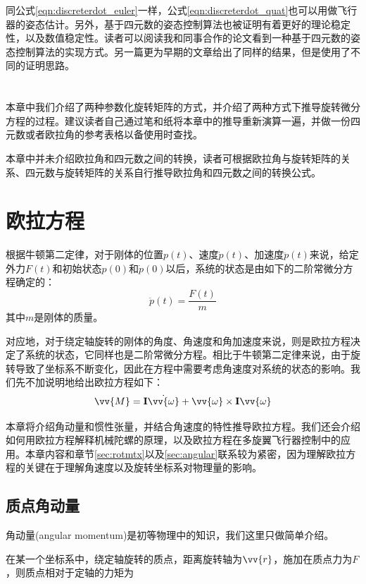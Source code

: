 \documentclass[11pt]{article}
\begin{document}
同公式\ref{eqn:discreterdot_euler}一样，公式\ref{eqn:discreterdot_quat}也可以用做飞行器的姿态估计。另外，基于四元数的姿态控制算法也被证明有着更好的理论稳定性，以及数值稳定性。读者可以阅读我和同事合作的论文\cite{7139416}看到一种基于四元数的姿态控制算法的实现方式。另一篇更为早期的文章\cite{5717652}给出了同样的结果，但是使用了不同的证明思路。
\ \\
\ \\
\ \\
本章中我们介绍了两种参数化旋转矩阵的方式，并介绍了两种方式下推导旋转微分方程的过程。建议读者自己通过笔和纸将本章中的推导重新演算一遍，并做一份四元数或者欧拉角的参考表格以备使用时查找。

本章中并未介绍欧拉角和四元数之间的转换，读者可根据欧拉角与旋转矩阵的关系、四元数与旋转矩阵的关系自行推导欧拉角和四元数之间的转换公式。

\section{欧拉方程}\label{sec:euler}
​根据牛顿第二定律，对于刚体的位置$p(t)$、速度$\dot{p}(t)$、加速度$\ddot{p}(t)$来说，给定外力$F(t)$和初始状态$p(0)$和$\dot{p}(0)$以后，系统的状态是由如下的二阶常微分方程确定的：
\begin{equation}\label{eqn:newton2}
\ddot{p}(t) = \frac{F(t)}{m}
\end{equation}
其中$m$是刚体的质量。

对应地，对于绕定轴旋转的刚体的角度、角速度和角加速度来说，则是欧拉方程决定了系统的状态，它同样也是二阶常微分方程。相比于牛顿第二定律来说，由于旋转导致了坐标系不断变化，因此在方程中需要考虑角速度对系统的状态的影响。我们先不加说明地给出欧拉方程如下：
\begin{equation}
\vv{M} = {\bf I}\dot{\vv{\omega}} + \vv{\omega} \times {\bf I}\vv{\omega}
\end{equation}


本章将介绍角动量和惯性张量，并结合角速度的特性推导欧拉方程。我们还会介绍如何用欧拉方程解释机械陀螺的原理，以及欧拉方程在多旋翼飞行器控制中的应用。本章内容和章节\ref{sec:rotmtx}以及\ref{sec:angular}联系较为紧密，因为理解欧拉方程的关键在于理解角速度以及旋转坐标系对物理量的影响。
\subsection{质点角动量}
角动量(angular momentum)是初等物理中的知识，我们这里只做简单介绍。

在某一个坐标系中，绕定轴旋转的质点，距离旋转轴为$\vv{r}$，施加在质点力为$F$，则质点相对于定轴的力矩为
\end{document}
